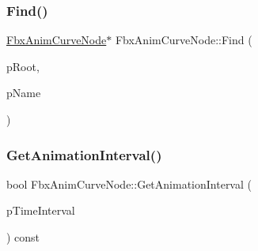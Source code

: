 \subsubsection{\texorpdfstring{Find()}{Find()}\hspace{0.1cm}{\footnotesize\ttfamily [2/2]}}
{\footnotesize\ttfamily \hyperlink{class_fbx_anim_curve_node}{Fbx\+Anim\+Curve\+Node}$\ast$ Fbx\+Anim\+Curve\+Node\+::\+Find (\begin{DoxyParamCaption}\item[{\hyperlink{class_fbx_anim_curve_node}{Fbx\+Anim\+Curve\+Node} $\ast$}]{p\+Root,  }\item[{const \hyperlink{class_fbx_string}{Fbx\+String} \&}]{p\+Name }\end{DoxyParamCaption})\hspace{0.3cm}{\ttfamily [protected]}}

\mbox{\label{class_fbx_anim_curve_node_a8bdce1ee829fd11bbd74ea2596f3977d}} 
\subsubsection{\texorpdfstring{Get\+Animation\+Interval()}{GetAnimationInterval()}}
{\footnotesize\ttfamily bool Fbx\+Anim\+Curve\+Node\+::\+Get\+Animation\+Interval (\begin{DoxyParamCaption}\item[{\hyperlink{class_fbx_time_span}{Fbx\+Time\+Span} \&}]{p\+Time\+Interval }\end{DoxyParamCaption}) const}

